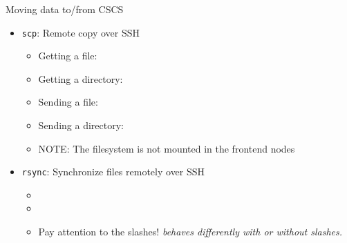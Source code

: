 \begin{frame}{Moving data to/from CSCS}
  \begin{itemize}
  \item \texttt{scp}: Remote copy over SSH
    \begin{itemize}
    \item Getting a file: 
    \item Getting a directory: 
    \item Sending a file: 
    \item Sending a directory: 
    \item NOTE: The  filesystem is not mounted in the frontend nodes
    \end{itemize}
  \item \texttt{rsync}: Synchronize files remotely over SSH
    \begin{itemize}
    \item {}
    \item {}
    \item Pay attention to the slashes!  \emph{behaves differently
      with or without slashes.}
    \end{itemize}
  \end{itemize}
\end{frame}
